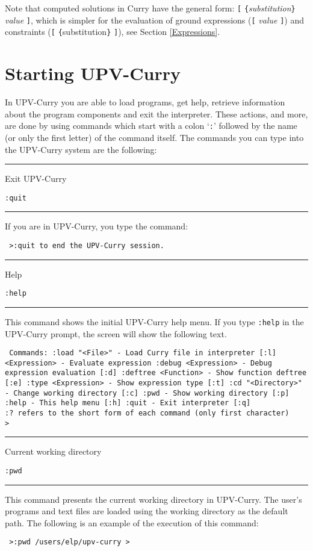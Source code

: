 \documentclass[titlepage,fleqn]{article}
\makeatletter
\newenvironment{prog}{\vspace{0.7ex}\par
\setlength{\parindent}{0.7cm}
\obeylines\@vobeyspaces\tt}
{\vspace{0.7ex}\noindent}
\newcommand{\iniprog}{\begin{prog}}
\newcommand{\finprog}{\end{prog}\noindent}
\newcommand{\pr}[1]{\mbox{\tt #1}}   %
\newcommand{\uptitle}[2]{ 
{
\noindent\rule{12.12cm}{.01in}
\vspace{0.25cm}
\noindent

{\large\sf #1}

\flushright 
\vspace{-0.78cm}
{\large\tt #2}
\vspace{0.1cm}

\noindent\rule{12.12cm}{.01in}
\vspace{0.2cm}
\hspace{-0.25cm}\noindent
}
}
\newcommand{\prompt}{\pr{>}}
\makeatother
\begin{document}
\noindent
Note that computed solutions in Curry have the general form: \linebreak
\pr{[} \pr{\{}{\em substitution}\pr{\}} {\em value} \pr{]},
which is simpler for the evaluation of ground expressions
(\pr{[} {\em value} \pr{]}) and 
constraints (\pr{[} \pr{\{}substitution\pr{\}} \pr{]}), 
see Section \ref{Expressions}.

\section{Starting UPV-Curry}\label{commands}

In UPV-Curry you are able to load
programs, get help, retrieve information 
about the program components and exit the interpreter. 
These actions, and more, are done by using commands which start with a 
colon `\pr{:}' followed by the name (or only the first letter) of the command itself.
The commands you can type into the UPV-Curry system are the following:

\pagebreak
\uptitle{Exit UPV-Curry}{:quit}
If you are in UPV-Curry, you type the command:
\iniprog
\prompt :quit
\finprog
to end the UPV-Curry session.
\vspace{0.8cm}

\uptitle{Help}{:help}
This command shows the initial UPV-Curry help menu.
If you type \pr{:help} in the UPV-Curry prompt, the
screen will show the following text.
{\small
\iniprog
Commands:
   :load "<File>"      - Load Curry file in interpreter [:l]
   <Expression>        - Evaluate expression
   :debug <Expression> - Debug expression evaluation    [:d]
   :deftree <Function> - Show function deftree          [:e]
   :type <Expression>  - Show expression type           [:t]
   :cd "<Directory>"   - Change working directory       [:c]
   :pwd                - Show working directory         [:p]
   :help               - This help menu                 [:h]
   :quit               - Exit interpreter               [:q]\\

 :? refers to the short form of each command (only first character)\\

\prompt
\finprog}

\uptitle{Current working directory}{:pwd}
This command presents the current working directory in UPV-Curry.
The user's programs and text files are loaded using the working directory 
as the default path. The following is an example of the execution of this
command:
\iniprog
\prompt :pwd
/users/elp/upv-curry
\prompt 
\finprog
\end{document}
